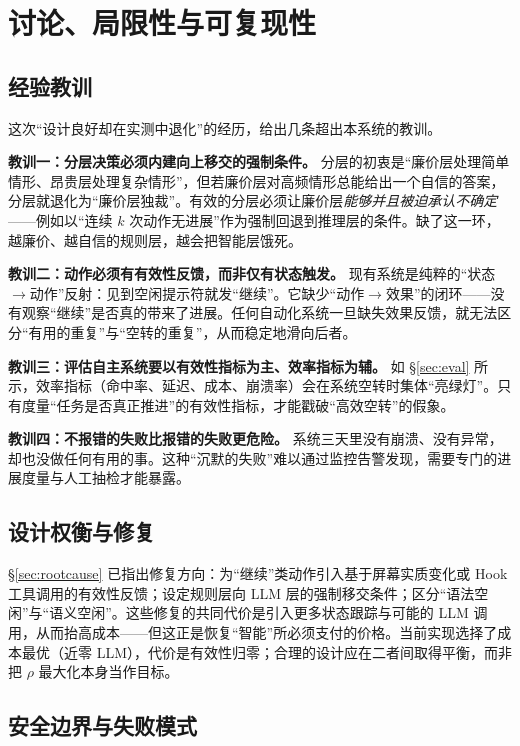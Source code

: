 \section{讨论、局限性与可复现性}
\label{sec:discussion}

\subsection{经验教训}

这次“设计良好却在实测中退化”的经历，给出几条超出本系统的教训。

\textbf{教训一：分层决策必须内建向上移交的强制条件。} 分层的初衷是“廉价层处理简单情形、昂贵层处理复杂情形”，但若廉价层对高频情形总能给出一个自信的答案，分层就退化为“廉价层独裁”。有效的分层必须让廉价层\emph{能够并且被迫承认不确定}——例如以“连续 $k$ 次动作无进展”作为强制回退到推理层的条件。缺了这一环，越廉价、越自信的规则层，越会把智能层饿死。

\textbf{教训二：动作必须有有效性反馈，而非仅有状态触发。} 现有系统是纯粹的“状态$\to$动作”反射：见到空闲提示符就发“继续”。它缺少“动作$\to$效果”的闭环——没有观察“继续”是否真的带来了进展。任何自动化系统一旦缺失效果反馈，就无法区分“有用的重复”与“空转的重复”，从而稳定地滑向后者。

\textbf{教训三：评估自主系统要以有效性指标为主、效率指标为辅。} 如 \S\ref{sec:eval} 所示，效率指标（命中率、延迟、成本、崩溃率）会在系统空转时集体“亮绿灯”。只有度量“任务是否真正推进”的有效性指标，才能戳破“高效空转”的假象。

\textbf{教训四：不报错的失败比报错的失败更危险。} 系统三天里没有崩溃、没有异常，却也没做任何有用的事。这种“沉默的失败”难以通过监控告警发现，需要专门的进展度量与人工抽检才能暴露。

\subsection{设计权衡与修复}

\S\ref{sec:rootcause} 已指出修复方向：为“继续”类动作引入基于屏幕实质变化或 Hook 工具调用的有效性反馈；设定规则层向 LLM 层的强制移交条件；区分“语法空闲”与“语义空闲”。这些修复的共同代价是引入更多状态跟踪与可能的 LLM 调用，从而抬高成本——但这正是恢复“智能”所必须支付的价格。当前实现选择了成本最优（近零 LLM），代价是有效性归零；合理的设计应在二者间取得平衡，而非把 $\rho$ 最大化本身当作目标。

\subsection{安全边界与失败模式}

